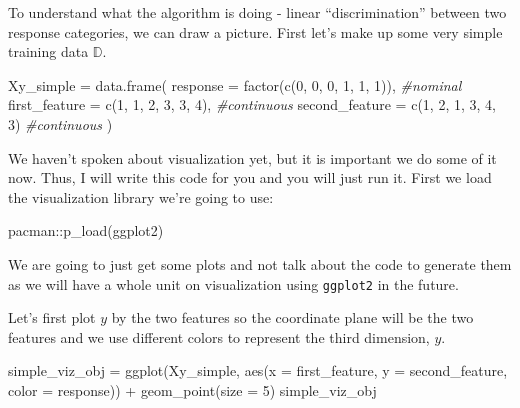 \documentclass[
]{article}
\newenvironment{Shaded}{\begin{snugshade}}{\end{snugshade}}
\newcommand{\AttributeTok}[1]{\textcolor[rgb]{0.77,0.63,0.00}{#1}}
\newcommand{\CommentTok}[1]{\textcolor[rgb]{0.56,0.35,0.01}{\textit{#1}}}
\newcommand{\DecValTok}[1]{\textcolor[rgb]{0.00,0.00,0.81}{#1}}
\newcommand{\FunctionTok}[1]{\textcolor[rgb]{0.00,0.00,0.00}{#1}}
\newcommand{\NormalTok}[1]{#1}
\newcommand{\OtherTok}[1]{\textcolor[rgb]{0.56,0.35,0.01}{#1}}
\newcommand{\SpecialCharTok}[1]{\textcolor[rgb]{0.00,0.00,0.00}{#1}}
\begin{document}
To understand what the algorithm is doing - linear ``discrimination''
between two response categories, we can draw a picture. First let's make
up some very simple training data \(\mathbb{D}\).

\begin{Shaded}
\begin{Highlighting}[]
\NormalTok{Xy\_simple }\OtherTok{=} \FunctionTok{data.frame}\NormalTok{(}
 \AttributeTok{response =} \FunctionTok{factor}\NormalTok{(}\FunctionTok{c}\NormalTok{(}\DecValTok{0}\NormalTok{, }\DecValTok{0}\NormalTok{, }\DecValTok{0}\NormalTok{, }\DecValTok{1}\NormalTok{, }\DecValTok{1}\NormalTok{, }\DecValTok{1}\NormalTok{)), }\CommentTok{\#nominal}
 \AttributeTok{first\_feature =} \FunctionTok{c}\NormalTok{(}\DecValTok{1}\NormalTok{, }\DecValTok{1}\NormalTok{, }\DecValTok{2}\NormalTok{, }\DecValTok{3}\NormalTok{, }\DecValTok{3}\NormalTok{, }\DecValTok{4}\NormalTok{),    }\CommentTok{\#continuous}
 \AttributeTok{second\_feature =} \FunctionTok{c}\NormalTok{(}\DecValTok{1}\NormalTok{, }\DecValTok{2}\NormalTok{, }\DecValTok{1}\NormalTok{, }\DecValTok{3}\NormalTok{, }\DecValTok{4}\NormalTok{, }\DecValTok{3}\NormalTok{)    }\CommentTok{\#continuous}
\NormalTok{)}
\end{Highlighting}
\end{Shaded}

We haven't spoken about visualization yet, but it is important we do
some of it now. Thus, I will write this code for you and you will just
run it. First we load the visualization library we're going to use:

\begin{Shaded}
\begin{Highlighting}[]
\NormalTok{pacman}\SpecialCharTok{::}\FunctionTok{p\_load}\NormalTok{(ggplot2)}
\end{Highlighting}
\end{Shaded}

We are going to just get some plots and not talk about the code to
generate them as we will have a whole unit on visualization using
\texttt{ggplot2} in the future.

Let's first plot \(y\) by the two features so the coordinate plane will
be the two features and we use different colors to represent the third
dimension, \(y\).

\begin{Shaded}
\begin{Highlighting}[]
\NormalTok{simple\_viz\_obj }\OtherTok{=} \FunctionTok{ggplot}\NormalTok{(Xy\_simple, }\FunctionTok{aes}\NormalTok{(}\AttributeTok{x =}\NormalTok{ first\_feature, }\AttributeTok{y =}\NormalTok{ second\_feature, }\AttributeTok{color =}\NormalTok{ response)) }\SpecialCharTok{+} 
  \FunctionTok{geom\_point}\NormalTok{(}\AttributeTok{size =} \DecValTok{5}\NormalTok{)}
\NormalTok{simple\_viz\_obj}
\end{Highlighting}
\end{Shaded}
\end{document}
